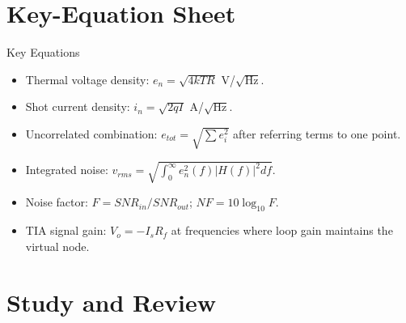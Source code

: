 \documentclass[10pt,letterpaper]{article}
\begin{document}
\section{Key-Equation Sheet}
\begin{CornellExamBox}{Key Equations}
\begin{itemize}
  \item Thermal voltage density: $e_n=\sqrt{4kTR}$ V/$\sqrt{\mathrm{Hz}}$.
  \item Shot current density: $i_n=\sqrt{2qI}$ A/$\sqrt{\mathrm{Hz}}$.
  \item Uncorrelated combination: $e_{tot}=\sqrt{\sum e_i^2}$ after referring terms to one point.
  \item Integrated noise: $v_{rms}=\sqrt{\int_0^{\infty}e_n^2(f)|H(f)|^2df}$.
  \item Noise factor: $F=SNR_{in}/SNR_{out}$; $NF=10\log_{10}F$.
  \item TIA signal gain: $V_o=-I_sR_f$ at frequencies where loop gain maintains the virtual node.
\end{itemize}\end{CornellExamBox}
\section{Study and Review}
\end{document}
